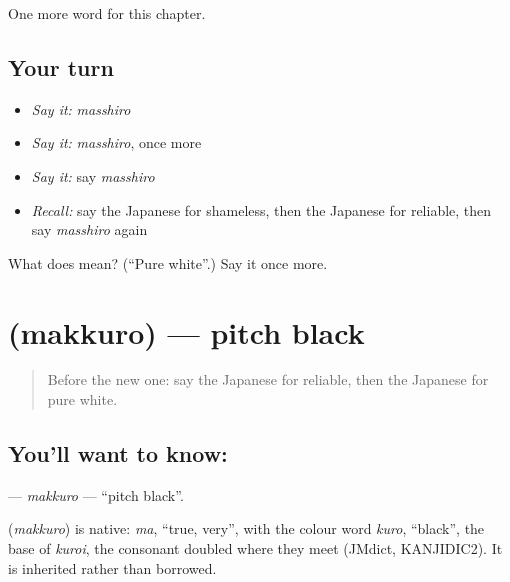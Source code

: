 \begin{grammarlens}[title={What you've built}]
One more word for this chapter.
\end{grammarlens}

\subsection*{Your turn}
\begin{itemize}
\raggedright
  \item \emph{Say it:} \emph{masshiro}
  \item \emph{Say it:} \emph{masshiro}, once more
  \item \emph{Say it:} say \emph{masshiro}
  \item \emph{Recall:} say the Japanese for shameless, then the Japanese for reliable, then say \emph{masshiro} again
\end{itemize}

\begin{tcolorbox}[breakable,colback=teal!4,colframe=teal!35!black,title={Before you move on}]
What does  mean? (\textquotedblleft{}Pure white\textquotedblright{}.) Say it once more.
\end{tcolorbox}
\section[\texorpdfstring{\ja{まっくろ} (makkuro)}{まっくろ (makkuro)}]{ (makkuro) — pitch black}

\label{lesson:JA-C130-makkuro}



\begin{quote}
Before the new one: say the Japanese for reliable, then the Japanese for pure white.
\end{quote}

\subsection*{You'll want to know: }
\textbf{} — \emph{makkuro} — \textquotedblleft{}pitch black\textquotedblright{}.

\begin{cousinweb}
\textbf{} (\emph{makkuro}) is native: \emph{ma}, \textquotedblleft{}true, very\textquotedblright{}, with the colour word \emph{kuro}, \textquotedblleft{}black\textquotedblright{}, the base of \emph{kuroi}, the consonant doubled where they meet (JMdict, KANJIDIC2). It is inherited rather than borrowed.
\end{cousinweb}

